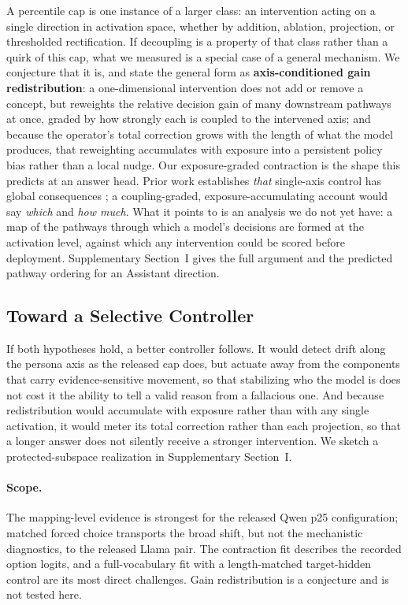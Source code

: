 \documentclass[letterpaper]{article} %
\begin{document}
A percentile cap is one instance of a larger class: an intervention acting on a single direction in activation space, whether by addition, ablation, projection, or thresholded rectification. If decoupling is a property of that class rather than a quirk of this cap, what we measured is a special case of a general mechanism. We conjecture that it is, and state the general form as \textbf{axis-conditioned gain redistribution}: a one-dimensional intervention does not add or remove a concept, but reweights the relative decision gain of many downstream pathways at once, graded by how strongly each is coupled to the intervened axis; and because the operator's total correction grows with the length of what the model produces, that reweighting accumulates with exposure into a persistent policy bias rather than a local nudge. Our exposure-graded contraction is the shape this predicts at an answer head. Prior work establishes \emph{that} single-axis control has global consequences \citep{xu2026steering,luo2026focus,hong2025reasoning,hoang2026sae}; a coupling-graded, exposure-accumulating account would say \emph{which} and \emph{how much}. What it points to is an analysis we do not yet have: a map of the pathways through which a model's decisions are formed at the activation level, against which any intervention could be scored before deployment. Supplementary Section~I gives the full argument and the predicted pathway ordering for an Assistant direction.

\subsection{Toward a Selective Controller}

If both hypotheses hold, a better controller follows. It would detect drift along the persona axis as the released cap does, but actuate away from the components that carry evidence-sensitive movement, so that stabilizing who the model is does not cost it the ability to tell a valid reason from a fallacious one. And because redistribution would accumulate with exposure rather than with any single activation, it would meter its total correction rather than each projection, so that a longer answer does not silently receive a stronger intervention. We sketch a protected-subspace realization in Supplementary Section~I.

\paragraph{Scope.}
The mapping-level evidence is strongest for the released Qwen p25 configuration; matched forced choice transports the broad shift, but not the mechanistic diagnostics, to the released Llama pair. The contraction fit describes the recorded option logits, and a full-vocabulary fit with a length-matched target-hidden control are its most direct challenges. Gain redistribution is a conjecture and is not tested here.
\end{document}
